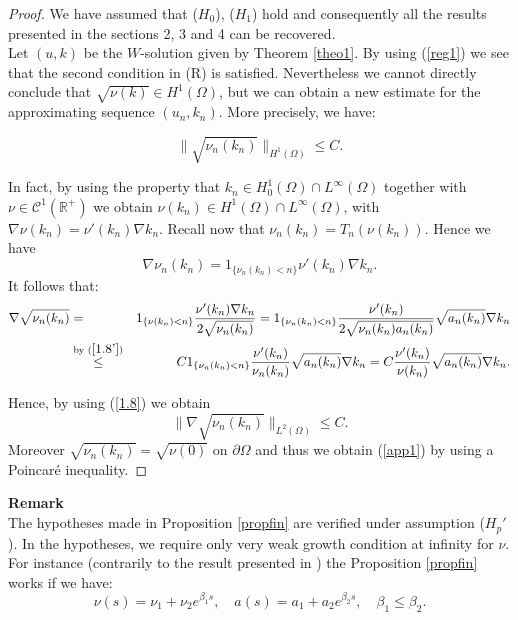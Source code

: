 \documentclass{elsart}
\begin{document}
\begin{proof}
We have assumed that ($H_0$), ($H_1$) hold and consequently all the
results presented in the sections 2, 3 and 4 can be recovered. \\ 

Let $(u,k)$ be the $W$-solution given by Theorem \ref{theo1}.  
By using (\ref{reg1}) we see that the second condition in (R) is
satisfied. Nevertheless we cannot directly conclude that 
$\sqrt{\nu(k)} \in H^1(\Omega)$, but we can obtain a new estimate
for the approximating sequence $(u_n,k_n)$. More precisely, we have: 

\begin{equation} 
\|\sqrt{\nu_n(k_n)}\|_{H^1(\Omega)} \leq C. \label{app1}
\end{equation}

In fact, by using the property that $k_n \in H^1_0(\Omega) \cap
L^{\infty}(\Omega)$ together with $\nu \in \mathcal{C}^1(\mathbb R^{+})$ we obtain 
$\nu(k_n) \in H^1(\Omega)\cap L^{\infty}(\Omega)$, with  
$\nabla \nu(k_n)=\nu'(k_n)\nabla k_n$. Recall now that 
$\nu_n(k_n) = T_n(\nu(k_n))$. Hence we have 
$$\nabla \nu_n(k_n)= 1_{\{\nu_n(k_n) < n\}} \nu'(k_n)\nabla k_n.$$
It follows that: 
\begin{eqnarray*} 
\nabla \sqrt{\nu_n(k_n)}&=& 1_{\{ \nu(k_n) < n\}}
\frac{\nu'(k_n)\nabla k_n}{2 \sqrt{\nu_n(k_n)}}  
= 1_{\{\nu_n(k_n) < n\}}
\frac{\nu'(k_n)}{2 \sqrt{\nu_n(k_n) a_n(k_n)}} \sqrt{a_n(k_n)} \nabla k_n
\\ 
&\overset{\text{by }(\ref{1.8'})}{\leq}& C 1_{\{\nu_n(k_n) < n\}}
\frac{\nu'(k_n)}{\nu_n(k_n)} \sqrt{a_n(k_n)} \nabla
k_n = C \frac{\nu'(k_n)}{\nu(k_n)} \sqrt{a_n(k_n)} \nabla
k_n. 
\end{eqnarray*}
 
Hence, by using (\ref{1.8}) we obtain 
$$\|\nabla \sqrt{\nu_n(k_n)}\|_{L^2(\Omega)} \leq C.$$
Moreover $\sqrt{\nu_n(k_n)} = \sqrt{\nu(0)}$ on $\partial
\Omega$ and thus we obtain (\ref{app1}) by using a Poincar\'e
inequality.
\end{proof}  
{\bf Remark} \noindent \\ 
The hypotheses made in Proposition \ref{propfin} are verified
under assumption ($H_p'$). In the hypotheses, we require only very weak
growth condition at infinity for $\nu$. For instance (contrarily to
the result presented in \cite{gal}) the Proposition \ref{propfin}
works if we have: \\ 
$$\nu(s) = \nu_1 + \nu_2 e^{\beta_1 s}, \quad a(s) = a_1 + a_2
e^{\beta_2 s}, \quad \beta_1 \leq \beta_2.$$  
\end{document}
